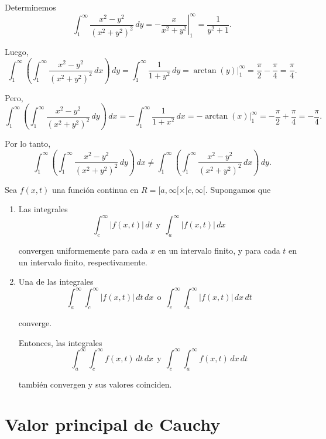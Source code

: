 \begin{ejemplo}
Determinemos
$$\int_1^{\infty} \frac{x^2-y^2}{(x^2+y^2)^2} \,dy = \left. - \frac{x}{x^2+y^2} \right|_1^{\infty} = \frac{1}{y^2+1}.$$

Luego,
$$\int_1^{\infty} \left( \int_1^{\infty} \frac{x^2-y^2}{(x^2+y^2)^2} \,dx \right) \,dy = \int_1^{\infty} \frac{1}{1+y^2} \,dy = \left. \arctan(y) \right|_1^{\infty} =  \frac{\pi}{2} - \frac{\pi}{4} = \frac{\pi}{4}.$$

Pero,
$$\int_1^{\infty} \left( \int_1^{\infty} \frac{x^2-y^2}{(x^2+y^2)^2} \,dy \right) \,dx = - \int_1^{\infty} \frac{1}{1+x^2} \,dx = \left. - \arctan(x) \right|_1^{\infty} = - \frac{\pi}{2} + \frac{\pi}{4} = - \frac{\pi}{4}.$$

Por lo tanto,
$$\int_1^{\infty} \left( \int_1^{\infty} \frac{x^2-y^2}{(x^2+y^2)^2} \,dy \right) \,dx \neq \int_1^{\infty} \left( \int_1^{\infty} \frac{x^2-y^2}{(x^2+y^2)^2} \,dx \right) \,dy. $$

\end{ejemplo}

\begin{teorema}
     Sea $f(x,t)$ una función continua en $R = [a, \infty[ \times [c,\infty[$. Supongamos que

     \begin{enumerate}
         \item Las integrales
         $$\int_c^{\infty} |f(x,t)| \,dt ~~\text{y}~~ \int_a^{\infty} |f(x,t)|\,dx$$

         convergen uniformemente para cada $x$ en un intervalo finito, y para cada $t$ en un intervalo finito, respectivamente.

         \item Una de las integrales
         $$\int_a^{\infty} \int_c^{\infty} |f(x,t)| \,dt \,dx  ~~\text{o}~~ \int_c^{\infty} \int_a^{\infty} |f(x,t)|\,dx \,dt $$

         converge.

         Entonces, las integrales 
        $$\int_a^{\infty} \int_c^{\infty} f(x,t) \,dt \,dx  ~~\text{y}~~ \int_c^{\infty} \int_a^{\infty} f(x,t) \,dx \,dt $$

        también convergen y sus valores coinciden.
     \end{enumerate}
\end{teorema}

\section{Valor principal de Cauchy}

